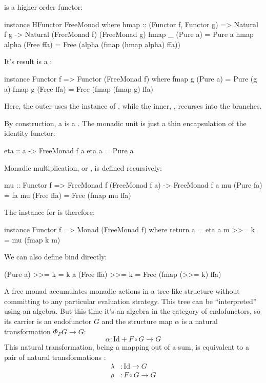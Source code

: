 \documentclass[DaoFP]{subfiles}
\begin{document}
 is a higher order functor:
\begin{haskell}
instance HFunctor FreeMonad where
   hmap :: (Functor f, Functor g) =>
      Natural f g -> Natural (FreeMonad f) (FreeMonad g)
   hmap _ (Pure a) = Pure a
   hmap alpha (Free ffa) = Free (alpha (fmap (hmap alpha) ffa))
\end{haskell}

It's result is a :
\begin{haskell}
instance Functor f => Functor (FreeMonad f) where
  fmap g (Pure a) = Pure (g a)
  fmap g (Free ffa) = Free (fmap (fmap g) ffa)
\end{haskell}
Here, the outer  uses the  instance of , while the inner, , recurses into the branches.

By construction, a  is a . The monadic unit  is just a thin encapsulation of the identity functor:
\begin{haskell}
eta :: a -> FreeMonad f a
eta a = Pure a
\end{haskell}

Monadic multiplication, or , is defined recursively:
\begin{haskell}
mu :: Functor f => FreeMonad f (FreeMonad f a) -> FreeMonad f a
mu (Pure fa) = fa
mu (Free ffa) = Free (fmap mu ffa)
\end{haskell}

The  instance for  is therefore:
\begin{haskell}
instance Functor f => Monad (FreeMonad f) where
  return a = eta a
  m >>= k = mu (fmap k m)
\end{haskell}

We can also define bind directly:
\begin{haskell}
  (Pure a)   >>= k = k a
  (Free ffa) >>= k = Free (fmap (>>= k) ffa)
\end{haskell}

A free monad accumulates monadic actions in a tree-like structure without committing to any particular evaluation strategy. This tree can be ``interpreted'' using an algebra. But this time it's an algebra in the category of endofunctors, so its carrier is an endofunctor $G$ and the structure map $\alpha$ is a natural transformation $\Phi_F G \to G$:
\[ \alpha \colon \text{Id} + F \circ G \to G\]
This natural transformation, being a mapping out of a sum, is equivalent to a pair of natural transformations :
\begin{align*}
\lambda &\colon \text{Id} \to G
\\
\rho &\colon F \circ G \to G
\end{align*}
\end{document}
